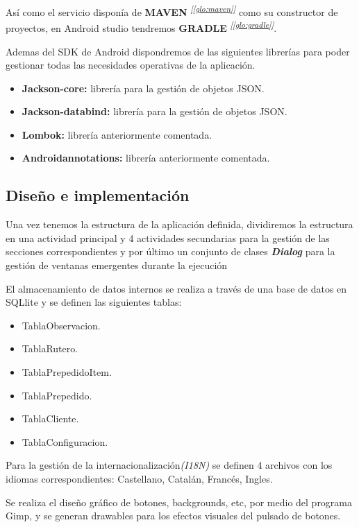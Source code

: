 Así como el servicio disponía de \textbf{MAVEN} \textsuperscript{\textit{[\ref{glo:maven}]}} como su constructor de proyectos, en Android studio tendremos \textbf{GRADLE} \textsuperscript{\textit{[\ref{glo:gradle}]}}.

Ademas del SDK de Android dispondremos de las siguientes librerías para poder gestionar todas las necesidades operativas de la aplicación.

\begin{itemize}	
	\item \textbf{Jackson-core: } librería para la gestión de objetos JSON. 
	\item \textbf{Jackson-databind: }  librería para la gestión de objetos JSON. 
	\item \textbf{Lombok: } librería anteriormente comentada. 
	\item \textbf{Androidannotations: } librería anteriormente comentada. 
\end{itemize}

\subsection{Diseño e implementación}
Una vez tenemos la estructura de la aplicación definida, dividiremos la estructura en una actividad principal y 4 actividades secundarias para la gestión de las secciones correspondientes y por último un conjunto de clases \textit{\textbf{Dialog}} para la gestión de ventanas emergentes durante la ejecución

El almacenamiento de datos internos se realiza a través de una base de datos en SQLlite y se definen las siguientes tablas:


\begin{itemize}	
	\item TablaObservacion.
	\item TablaRutero.
	\item TablaPrepedidoItem.
	\item TablaPrepedido.
	\item TablaCliente.
	\item TablaConfiguracion.
\end{itemize}	

Para la gestión de la internacionalización\textit{(I18N)} se definen 4 archivos con los idiomas correspondientes: Castellano, Catalán, Francés, Ingles. 

Se realiza el diseño gráfico de botones, backgrounds, etc, por medio del programa Gimp, y se generan drawables para los efectos visuales del pulsado de botones.

